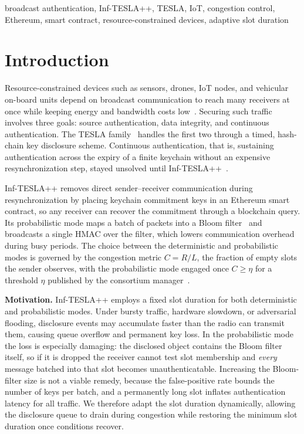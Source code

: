 \documentclass[conference]{IEEEtran}
\begin{document}
\begin{IEEEkeywords}
broadcast authentication, Inf-TESLA++, TESLA, IoT, congestion control,
Ethereum, smart contract, resource-constrained devices, adaptive slot duration
\end{IEEEkeywords}

\section{Introduction}

Resource-constrained devices such as sensors, drones, IoT nodes, and vehicular
on-board units depend on broadcast communication to reach many receivers at once
while keeping energy and bandwidth costs low~\cite{inftesla}. Securing such
traffic involves three goals: source authentication, data integrity, and
continuous authentication. The TESLA family~\cite{tesla} handles the first two
through a timed, hash-chain key disclosure scheme. Continuous authentication,
that is, sustaining authentication across the expiry of a finite keychain
without an expensive resynchronization step, stayed unsolved until
Inf-TESLA++~\cite{inftesla}.

Inf-TESLA++ removes direct sender--receiver communication during
resynchronization by placing keychain commitment keys in an Ethereum smart
contract, so any receiver can recover the commitment through a blockchain query.
Its probabilistic mode maps a batch of packets into a Bloom filter~\cite{bloom}
and broadcasts a single HMAC over the filter, which lowers communication overhead
during busy periods. The choice between the deterministic and probabilistic
modes is governed by the congestion metric $C = R/L$, the fraction of empty slots
the sender observes, with the probabilistic mode engaged once $C \geq \eta$ for a
threshold $\eta$ published by the consortium manager~\cite{inftesla}.

\textbf{Motivation.} Inf-TESLA++ employs a fixed slot duration for both
deterministic and probabilistic modes. Under bursty traffic, hardware slowdown,
or adversarial flooding, disclosure events may accumulate faster than the radio
can transmit them, causing queue overflow and permanent key loss. In the
probabilistic mode the loss is especially damaging: the disclosed object contains
the Bloom filter itself, so if it is dropped the receiver cannot test slot
membership and \emph{every} message batched into that slot becomes
unauthenticatable. Increasing the Bloom-filter size is not a viable remedy,
because the false-positive rate bounds the number of keys per batch, and a
permanently long slot inflates authentication latency for all traffic. We
therefore adapt the slot duration dynamically, allowing the disclosure queue to
drain during congestion while restoring the minimum slot duration once conditions
recover.
\end{document}
